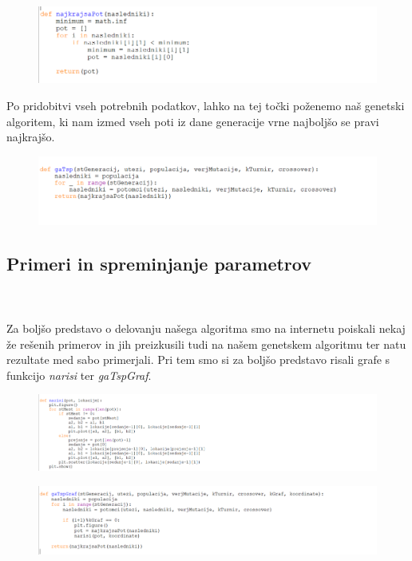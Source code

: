 \documentclass[12pt,a4paper]{amsart}
\theoremstyle{definition} %
\theoremstyle{plain} %
\begin{document}
\begin{figure}[ht]
\centering
\includegraphics[width=1\textwidth]{najkrajsapot}
\end{figure}

Po pridobitvi vseh potrebnih podatkov, lahko na tej točki poženemo naš genetski algoritem, ki nam izmed vseh poti iz dane generacije vrne najboljšo se pravi najkrajšo. 
\begin{figure}[ht]
\centering
\includegraphics[width=1\textwidth]{gatsp}
\end{figure}
\newpage

\subsection{Primeri in spreminjanje parametrov}
\
\\
\\
Za boljšo predstavo o delovanju našega algoritma smo na internetu poiskali nekaj že rešenih primerov in jih preizkusili tudi na našem genetskem algoritmu ter natu rezultate med sabo primerjali. Pri tem smo si za boljšo predstavo risali grafe s funkcijo \textit{narisi}  ter \textit{gaTspGraf}. 

\begin{figure}[ht]
\centering
\includegraphics[width=1\textwidth]{narisi}
\end{figure}

\begin{figure}[ht]
\centering
\includegraphics[width=1\textwidth]{gatspgraf}
\end{figure}
\end{document}
